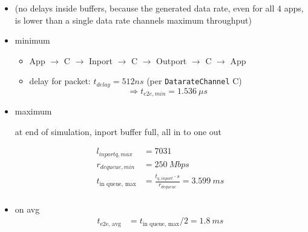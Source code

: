 \documentclass[]{scrartcl}
\begin{document}
        \begin{itemize}
            \item (no delays inside buffers, because the generated data rate, even for all 4 apps, is lower than a single data rate channels maximum throughput)
            \item minimum
                \begin{itemize}
                    \item App $\rightarrow$ C $\rightarrow$ Inport
                        $\rightarrow$ C $\rightarrow$ Outport $\rightarrow$ C $\rightarrow$ App
                    \item delay for packet: $t_{delay}=512ns$ (per \verb|DatarateChannel| C)
                        \begin{equation}
                            \Rightarrow t_{e2e,min} = \SI{1.536}{\mu s}
                        \end{equation}
                \end{itemize}
            \item maximum

                at end of simulation, inport buffer full, all in to one out

                \begin{align}
                    l_{inport q, max} &= 7031\\
                    r_{dequeue, min} &= \SI{250}{Mbps}\\
                    t_\text{in queue, max} &= \frac{t_{q,inport}\cdot s}{r_{dequeue}} = \SI{3.599}{ms}\\
                \end{align}

            \item on avg
                \begin{align}
                    t_\text{e2e, avg} &= t_\text{in queue, max} / 2 = \SI{1.8}{ms}
                \end{align}

        \end{itemize}
\end{document}

